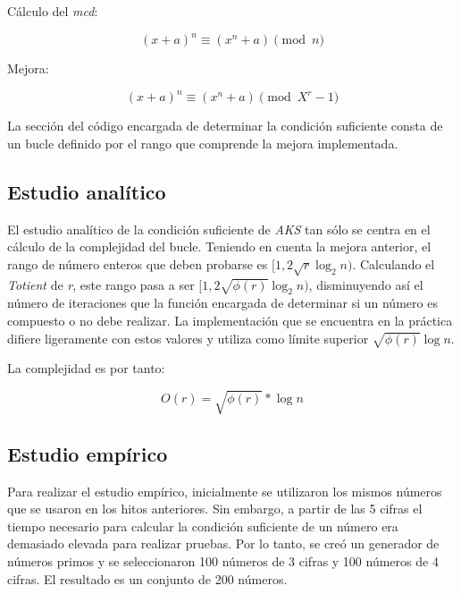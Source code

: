 \documentclass{uc3mpracticas}
\begin{document}
  \vspace{3mm}

  Cálculo del \textit{mcd}:

  $$ (x + a)^n \equiv (x^n + a)\pmod{n}$$


  Mejora:

  $$ (x + a)^n \equiv (x^n + a)\pmod{X^r-1}$$

  \vspace{2mm}

  La sección del código encargada de determinar la condición suficiente consta de un bucle definido por el rango que comprende la mejora implementada.




  \subsection{Estudio analítico}

  El estudio analítico de la condición suficiente de \textit{AKS} tan sólo se centra en el cálculo de la complejidad del bucle. Teniendo en cuenta la mejora anterior, el rango de número enteros que deben probarse es $[1, 2\sqrt{r}\log_2{n})$. Calculando el \textit{Totient} de \textit{r}, este rango pasa a ser $[1, 2\sqrt{\phi(r)}\log_2{n})$, disminuyendo así el número de iteraciones que la función encargada de determinar si un número es compuesto o no debe realizar. La implementación que se encuentra en la práctica difiere ligeramente con estos valores y utiliza como límite superior $\sqrt{\phi{(r)}}\log n$.

  \vspace{3mm}

  La complejidad es por tanto:

  $$ O(r) = \sqrt{\phi{(r)}} * \log n $$


  \subsection{Estudio empírico}

  Para realizar el estudio empírico, inicialmente se utilizaron los mismos números que se usaron en los hitos anteriores. Sin embargo, a partir de las 5 cifras el tiempo necesario para calcular la condición suficiente de un número era demasiado elevada para realizar pruebas. Por lo tanto, se creó un generador de números primos y se seleccionaron 100 números de 3 cifras y 100 números de 4 cifras. El resultado es un conjunto de 200 números.

  \vspace{3mm}
\end{document}
